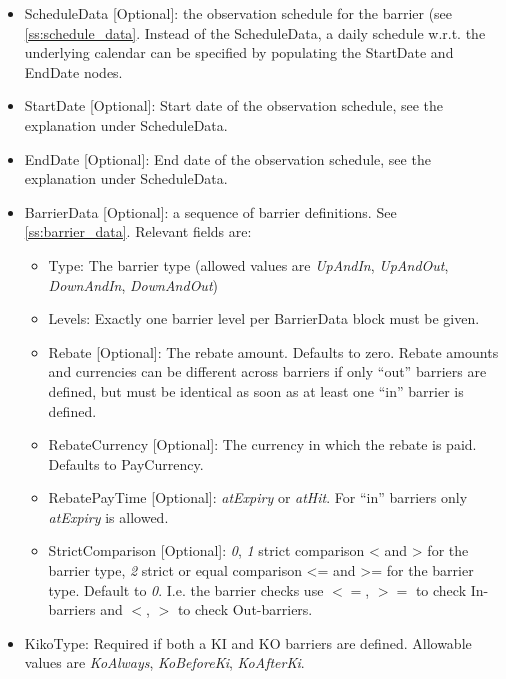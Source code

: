 \begin{itemize}
  \begin{itemize}
  \item ScheduleData [Optional]: the observation schedule for the barrier (see \ref{ss:schedule_data}. Instead of the ScheduleData,
    a daily schedule w.r.t. the underlying calendar can be specified by populating the StartDate and EndDate nodes.
  \item StartDate [Optional]: Start date of the observation schedule, see the explanation under ScheduleData.
  \item EndDate [Optional]: End date of the observation schedule, see the explanation under ScheduleData.
  \item BarrierData [Optional]: a sequence of barrier definitions. See \ref{ss:barrier_data}. Relevant fields are:
    \begin{itemize}
    \item Type: The barrier type (allowed values are \emph{UpAndIn}, \emph{UpAndOut}, \emph{DownAndIn}, \emph{DownAndOut})
    \item Levels: Exactly one barrier level per BarrierData block must be given.
    \item Rebate [Optional]: The rebate amount. Defaults to zero. Rebate amounts and currencies can be different across barriers
          if only ``out'' barriers are defined, but must be identical as soon as at least one ``in'' barrier is defined.
    \item RebateCurrency [Optional]: The currency in which the rebate is paid. Defaults to PayCurrency.
    \item RebatePayTime [Optional]: \emph{atExpiry} or \emph{atHit}. For ``in'' barriers only \emph{atExpiry} is allowed.
    \item StrictComparison [Optional]: \emph{0}, \emph{1} strict comparison < and > for the barrier type, \emph{2} strict or equal comparison <= and >= for the barrier type. Default to \emph{0}. I.e. the barrier checks use $<=$, $>=$ to check In-barriers and $<$, $>$ to check Out-barriers. \\
    \end{itemize}
  \item KikoType: Required if both a KI and KO barriers are defined. Allowable values are \emph{KoAlways}, \emph{KoBeforeKi},
    \emph{KoAfterKi}.
  \end{itemize}


\end{itemize}
